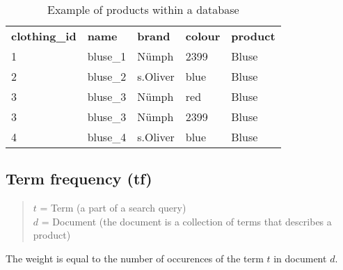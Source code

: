 \begin{table}[h]
    \begin{center}
    \begin{tabular}{ l l l l l }
        \rowcolor{Gray}
        \textbf{clothing\_id}   & \textbf{name} & \textbf{brand}    & \textbf{colour}   & \textbf{product}\\
        1                       & bluse\_1      & N\"umph           & 2399             & Bluse\\
        2                       & bluse\_2      & s.Oliver          & blue              & Bluse\\
        3                       & bluse\_3      & N\"umph           & red               & Bluse\\
        3                       & bluse\_3      & N\"umph           & 2399             & Bluse\\
        4                       & bluse\_4      & s.Oliver          & blue              & Bluse\\
    \end{tabular}
    \caption{Example of products within a database}
    \end{center}
\end{table}

\bigskip

\subsection{Term frequency (tf)}

\begin{quote}
    $t$ = Term (a part of a search query)\\
    $d$ = Document (the document is a collection of terms that describes a product)
\end{quote}
The weight is equal to the number of occurences of the term $t$ in document $d$.

